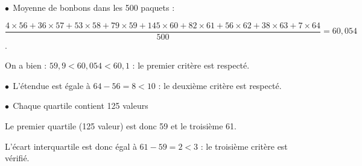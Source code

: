 
\medskip

%
%
%
%
%
%
%
% 
% 
$\bullet~~$Moyenne de bonbons dans les 500 paquets :

$\dfrac{4\times 56 + 36\times57 + 53\times58+79\times59 + 145\times60 + 82 \times61 + 56\times62 + 38\times63 + 7\times64}{500} = 60,054$.

On a bien : $59,9 < 60,054 < 60,1$ : le premier critère est respecté.

$\bullet~~$L'étendue est égale à $64 - 56 = 8 < 10$ : le deuxième critère est respecté.

$\bullet~~$Chaque quartile contient 125 valeurs

Le premier quartile (125 valeur) est donc 59 et le troisième 61.

L'écart interquartile est donc égal à $61 - 59 = 2 < 3$ : le troisième critère est vérifié.

\bigskip

